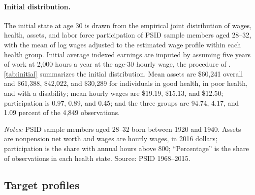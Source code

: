\paragraph{Initial distribution.}
The initial state at age 30 is drawn from the empirical joint distribution of wages, health, assets, and labor force participation of PSID sample members aged 28--32, with the mean of log wages adjusted to the estimated wage profile within each health group. %
Initial average indexed earnings are imputed by assuming five years of work at 2,000 hours a year at the age-30 hourly wage, the procedure of \citet{french2005effects}. %
\autoref{tab:initial} summarizes the initial distribution. Mean assets are \$60,241 overall and \$61,388, \$42,022, and \$30,289 for individuals in good health, in poor health, and with a disability; mean hourly wages are \$19.19, \$15.13, and \$12.50; participation is 0.97, 0.89, and 0.45; and the three groups are 94.74, 4.17, and 1.09 percent of the 4,849 observations. %

\begin{table}[!htbp]
\centering
\caption{Initial Conditions at Age 30}
\label{tab:initial}
\vspace{6pt}
\footnotesize
\begin{threeparttable}

\begin{tablenotes}[flushleft]\scriptsize
\item[] \textit{Notes:} PSID sample members aged 28--32 born between 1920 and 1940. Assets are nonpension net worth and wages are hourly wages, in 2016 dollars; participation is the share with annual hours above 800; ``Percentage'' is the share of observations in each health state. Source: PSID 1968--2015.
\end{tablenotes}
\end{threeparttable}
\end{table}

\subsection{Target profiles}\label{app:targets}

